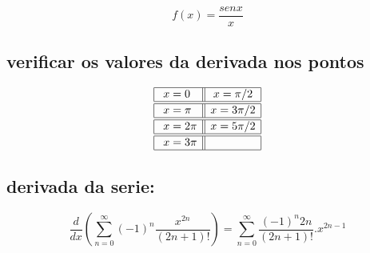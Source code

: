 \documentclass[11pt]{article}
\begin{document}
\begin{equation*}
f(x)   = \frac{senx}{x}
\end{equation*}

\hypertarget{verificar-os-valores-da-derivada-nos-pontos}{%
\subsection{verificar os valores da derivada nos
pontos}\label{verificar-os-valores-da-derivada-nos-pontos}}

\[\begin{array}{|l||c|}
\hline \
x = 0 & x = \pi/2\\
\hline
\hline \
x = \pi & x =3\pi/2\\
\hline
\hline \
x = 2\pi & x =5\pi/2\\
\hline
\hline \
x = 3\pi & \\
\hline
\end{array}\]

    \hypertarget{derivada-da-serie}{%
\subsection{derivada da serie:}\label{derivada-da-serie}}

\begin{equation*}
\frac{d}{dx}(\sum_{n=0}^\infty (-1)^n \frac{x^{2n}}{(2n+1)!}) = \sum_{n=0}^\infty \frac{(-1)^n 2n}{(2n+1)!}.x^{2n-1}
\end{equation*}
\end{document}
